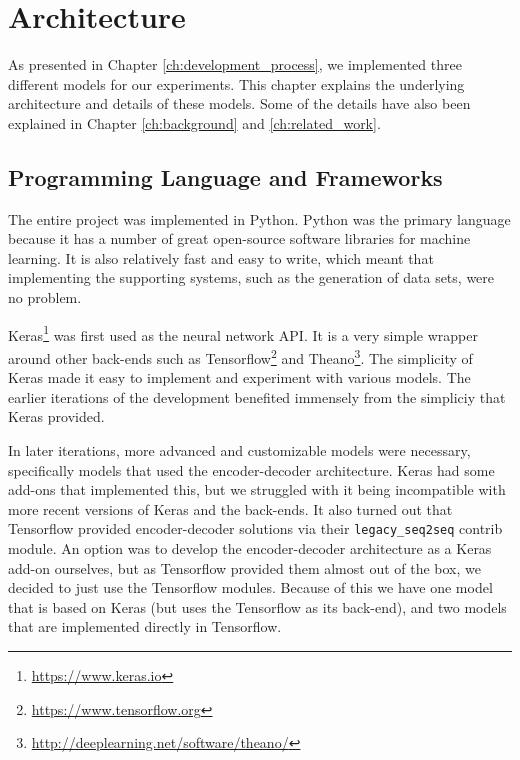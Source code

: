 
\chapter{Architecture}
\label{ch:architecture}
As presented in Chapter \ref{ch:development_process}, we implemented three different models for our experiments. This chapter explains the underlying architecture and details of these models. Some of the details have also been explained in Chapter \ref{ch:background} and \ref{ch:related_work}.


\section{Programming Language and Frameworks}
The entire project was implemented in Python. Python was the primary language because it has a number of great open-source software libraries for machine learning. It is also relatively fast and easy to write, which meant that implementing the supporting systems, such as the generation of data sets, were no problem.

Keras\footnote{\url{https://www.keras.io}} was first used as the neural network API. It is a very simple wrapper around other back-ends such as Tensorflow\footnote{\url{https://www.tensorflow.org}} and Theano\footnote{\url{http://deeplearning.net/software/theano/}}. The simplicity of Keras made it easy to implement and experiment with various models. The earlier iterations of the development benefited immensely from the simpliciy that Keras provided.

In later iterations, more advanced and customizable models were necessary, specifically models that used the encoder-decoder architecture. Keras had some add-ons that implemented this, but we struggled with it being incompatible with more recent versions of Keras and the back-ends. It also turned out that Tensorflow provided encoder-decoder solutions via their {\tt legacy\_seq2seq} contrib module. An option was to develop the encoder-decoder architecture as a Keras add-on ourselves, but as Tensorflow provided them almost out of the box, we decided to just use the Tensorflow modules. Because of this we have one model that is based on Keras (but uses the Tensorflow as its back-end), and two models that are implemented directly in Tensorflow.


